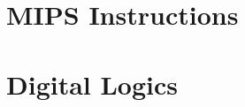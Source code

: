 \documentclass{article}
\begin{document}
\thispagestyle{empty}

\section{MIPS Instructions}


\section{Digital Logics}

\end{document}
